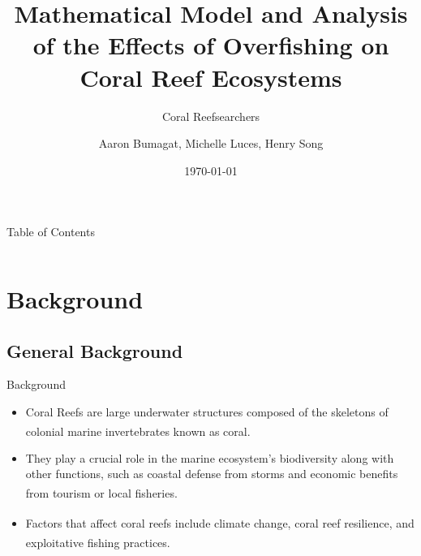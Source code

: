 \documentclass{beamer}
\title[]{Mathematical Model and Analysis of the Effects of Overfishing on Coral Reef Ecosystems}
\subtitle{Coral Reefsearchers}
\author{Aaron Bumagat, Michelle Luces, Henry Song }
\institute{University of Guam}
\date{\today}
\begin{document}
\frame{\titlepage}

\AtBeginSection[]{
    \begin{frame}{}
        \frametitle{}
        \setcounter{tocdepth}{2}
        \tableofcontents[currentsection, sections = \thesection]
        \setcounter{tocdepth}{1}
    \end{frame}
}

\begin{frame}{Table of Contents}
    \begin{columns}
        \begin{column}{0.5\textwidth}
            \tableofcontents[sections=1-2]
        \end{column}
        \begin{column}{0.5\textwidth}
            \tableofcontents[sections=3-5]
        \end{column}
    \end{columns}
\end{frame}


\section{Background}
\subsection{General Background}
\begin{frame}{Background}
    \begin{itemize}
        \item<1-> Coral Reefs are large underwater structures composed of the skeletons of colonial marine invertebrates known as coral\textsuperscript{\cite{ross}}.
         \item<2-> They play a crucial role in the marine ecosystem's biodiversity along with other functions, such as coastal defense from storms and economic benefits from tourism or local fisheries\textsuperscript{\cite{04_mathanalysis}}.
         \item<3-> Factors that affect coral reefs include climate change, coral reef resilience\textsuperscript{\cite{02_Riegl_Purkis_Model}}, and exploitative fishing practices\textsuperscript{\cite{05_quintero_machuca_cotto_bradley_ríos-soto_2016}}.
    \end{itemize}
\end{frame}
\end{document}
